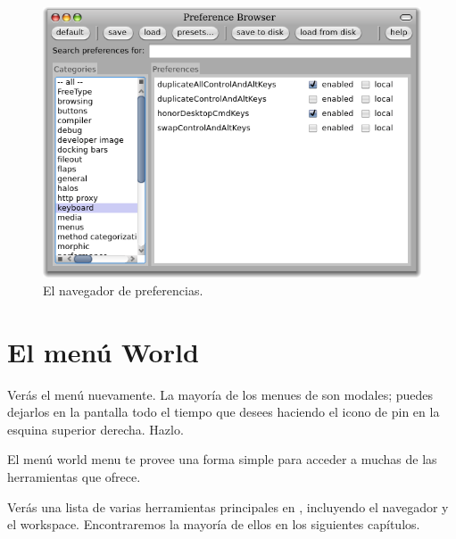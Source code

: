 \documentclass[a4paper,10pt,twoside]{book}
\begin{document}
\begin{figure}[htb]
\centerline{\includegraphics[width=\textwidth]{PreferenceBrowser}}
\caption{El navegador de preferencias.}
\end{figure}


\section{El men\'u World}

Ver\'as el men\'u  nuevamente.
La mayor\'ia de los menues de \pharo son modales; puedes dejarlos en la pantalla todo el tiempo que desees haciendo  el icono de pin en la esquina superior derecha. Hazlo.

El men\'u world menu te provee una forma simple para acceder a muchas de las herramientas que \pharo ofrece.


Ver\'as una lista de varias herramientas principales en \pharo, incluyendo el navegador y el workspace.
Encontraremos la mayor\'ia de ellos en los siguientes cap\'itulos.

\end{document}
